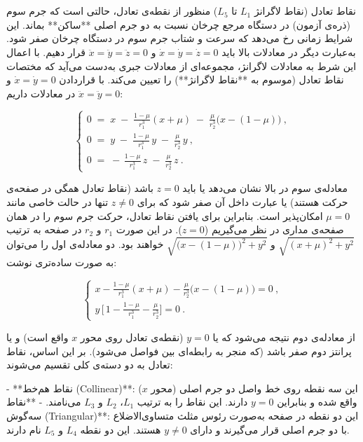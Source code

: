 \section{} نقاط تعادل (نقاط لاگرانژ $L_1$ تا $L_5$)  
منظور از نقطه‌ی تعادل، حالتی است که جرم سوم (ذره‌ی آزمون) در دستگاه مرجع چرخان نسبت به دو جرم اصلی **ساکن** بماند. این شرایط زمانی رخ می‌دهد که سرعت و شتاب جرم سوم در دستگاه چرخان صفر شود. به‌عبارت دیگر در معادلات بالا باید $\dot{x}=\dot{y}=\dot{z}=0$ و $\ddot{x}=\ddot{y}=\ddot{z}=0$ قرار دهیم. با اعمال این شرط به معادلات لاگرانژ، مجموعه‌ای از معادلات جبری به‌دست می‌آید که مختصات نقاط تعادل (موسوم به **نقاط لاگرانژ**) را تعیین می‌کند. با قراردادن $\dot{x}=\dot{y}=0$ و $\ddot{x}=\ddot{y}=0$ در معادلات داریم:

$$ 
\begin{cases}
	\displaystyle 0 \;=\; x \;-\; \frac{1-\mu}{r_1^3}(x+\mu) \;-\; \frac{\mu}{r_2^3}\Big(x-(1-\mu)\Big)~,  \\[2ex]
	\displaystyle 0 \;=\; y \;-\; \frac{1-\mu}{r_1^3}\,y \;-\; \frac{\mu}{r_2^3}\,y~,  \\[1ex]
	0 \;=\; -\,\frac{1-\mu}{r_1^3}\,z \;-\; \frac{\mu}{r_2^3}\,z~. 
\end{cases}
$$

معادله‌ی سوم در بالا نشان می‌دهد یا باید $z=0$ باشد (نقاط تعادل همگی در صفحه‌ی حرکت هستند) یا عبارت داخل آن صفر شود که برای $z\neq0$ تنها در حالت خاصی مانند $\mu=0$ امکان‌پذیر است. بنابراین برای یافتن نقاط تعادل، حرکت جرم سوم را در همان صفحه‌ی مداری در نظر می‌گیریم ($z=0$). در این صورت $r_1$ و $r_2$ در صفحه به ترتیب $\sqrt{(x+\mu)^2+y^2}$ و $\sqrt{\big(x-(1-\mu)\big)^2+y^2}$ خواهند بود. دو معادله‌ی اول را می‌توان به صورت ساده‌تری نوشت:

$$ 
\begin{cases}
	\displaystyle x - \frac{1-\mu}{r_1^3}(x+\mu) - \frac{\mu}{r_2^3}\Big(x-(1-\mu)\Big) = 0~,  \\[2ex]
	\displaystyle y\,\Big[\,1 - \frac{1-\mu}{r_1^3} - \frac{\mu}{r_2^3}\Big] = 0~. 
\end{cases}
$$

از معادله‌ی دوم نتیجه می‌شود که یا $y=0$ (نقطه‌ی تعادل روی محور $x$ واقع است) و یا پرانتز دوم صفر باشد (که منجر به رابطه‌ای بین فواصل می‌شود). بر این اساس، نقاط تعادل به دو دسته‌ی کلی تقسیم می‌شوند:

- **نقاط هم‌خط (Collinear)**: این سه نقطه روی خط واصل دو جرم اصلی (محور $x$) واقع شده و بنابراین $y=0$ دارند. این نقاط را به ترتیب $L_1$، $L_2$ و $L_3$ می‌نامند.  
- **نقاط سه‌گوش (Triangular)**: این دو نقطه در صفحه به‌صورت رئوس مثلث متساوی‌الاضلاع با دو جرم اصلی قرار می‌گیرند و دارای $y\neq0$ هستند. این دو نقطه $L_4$ و $L_5$ نام دارند.  

